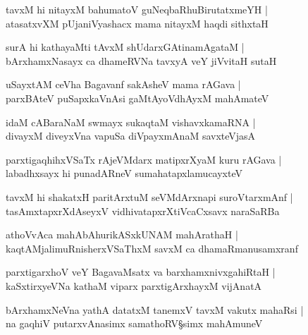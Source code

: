 \begin{shloka}
tavxM hi nitayxM bahumatoV guNeqbaRhuBirutatxmeYH |\\
atasatxvXM pUjaniVyashacx mama nitayxM haqdi sithxtaH 
\end{shloka}

\begin{shloka}
surA hi kathayaMti tAvxM shUdarxGAtinamAgataM  |\\
bArxhamxNasayx ca dhameRVNa tavxyA veY jiVvitaH sutaH
\end{shloka}

\begin{shloka}
uSayxtAM ceVha Bagavanf sakAsheV mama rAGava |\\
parxBAteV puSapxkaVnAsi gaMtAyoVdhAyxM mahAmateV 
\end{shloka}

\begin{shloka}
idaM cABaraNaM swmayx sukaqtaM vishavxkamaRNA |\\
divayxM diveyxVna vapuSa diVpayxmAnaM savxteVjasA 
\end{shloka}

\begin{shloka}
parxtigaqhihxVSaTx rAjeVMdarx matipxrXyaM kuru rAGava |\\
labadhxsayx hi punadARneV sumahatapxlamucayxteV 
\end{shloka}

\begin{shloka}
tavxM hi shakatxH paritArxtuM seVMdArxnapi suroVtarxmAnf |\\
tasAmxtapxrXdAseyxV vidhivatapxrXtiVcaCxsavx naraSaRBa
\end{shloka}

\begin{shloka}
athoVvAca mahAbAhurikASxkUNAM mahArathaH |\\
kaqtAMjalimuRnisherxVSaThxM savxM ca dhamaRmanusamxranf 
\end{shloka}

\begin{shloka}
parxtigarxhoV veY BagavaMsatx va barxhamxnivxgahiRtaH |\\
kaSxtirxyeVNa kathaM viparx parxtigArxhayxM vijAnatA 
\end{shloka}

\begin{shloka}
bArxhamxNeVna yathA datatxM tanemxV tavxM vakutx mahaRsi |\\
na gaqhiV putarxvAnasimx samathoRV\S simx mahAmuneV 
\end{shloka}

